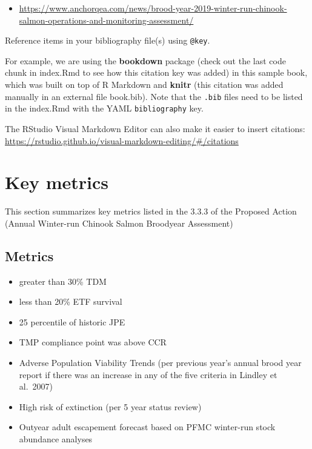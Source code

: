 \documentclass[
]{book}
\providecommand{\tightlist}{%
  \setlength{\itemsep}{0pt}\setlength{\parskip}{0pt}}
\theoremstyle{definition}
\theoremstyle{definition}
\theoremstyle{definition}
\theoremstyle{definition}
\theoremstyle{remark}
\begin{document}
\begin{itemize}
\tightlist
\item
  \url{https://www.anchorqea.com/news/brood-year-2019-winter-run-chinook-salmon-operations-and-monitoring-assessment/}
\end{itemize}

Reference items in your bibliography file(s) using \texttt{@key}.

For example, we are using the \textbf{bookdown} package \citep{R-bookdown} (check out the last code chunk in index.Rmd to see how this citation key was added) in this sample book, which was built on top of R Markdown and \textbf{knitr} \citep{xie2015} (this citation was added manually in an external file book.bib). Note that the \texttt{.bib} files need to be listed in the index.Rmd with the YAML \texttt{bibliography} key.

The RStudio Visual Markdown Editor can also make it easier to insert citations: \url{https://rstudio.github.io/visual-markdown-editing/\#/citations}

\hypertarget{key-metrics}{%
\chapter{Key metrics}\label{key-metrics}}

This section summarizes key metrics listed in the 3.3.3 of the Proposed Action (Annual Winter-run Chinook Salmon Broodyear Assessment)

\hypertarget{metrics}{%
\section{Metrics}\label{metrics}}

\begin{itemize}
\tightlist
\item
  greater than 30\% TDM
\item
  less than 20\% ETF survival
\item
  25 percentile of historic JPE
\item
  TMP compliance point was above CCR
\item
  Adverse Population Viability Trends (per previous year's annual brood year report if there was an increase in any of the five criteria in Lindley et al.~2007)
\item
  High risk of extinction (per 5 year status review)
\item
  Outyear adult escapement forecast based on PFMC winter-run stock abundance analyses
\end{itemize}
\end{document}
